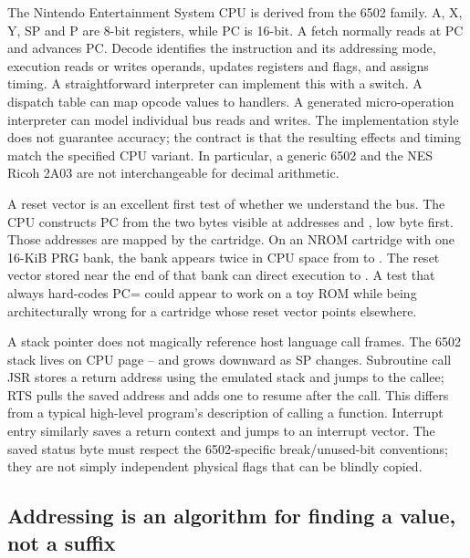 The Nintendo Entertainment System CPU is derived from the 6502 family. A, X, Y, SP and P are 8-bit registers, while PC is 16-bit. A fetch normally reads at PC and advances PC. Decode identifies the instruction and its addressing mode, execution reads or writes operands, updates registers and flags, and assigns timing. A straightforward interpreter can implement this with a switch. A dispatch table can map opcode values to handlers. A generated micro-operation interpreter can model individual bus reads and writes. The implementation style does not guarantee accuracy; the contract is that the resulting effects and timing match the specified CPU variant. In particular, a generic 6502 and the NES Ricoh 2A03 are not interchangeable for decimal arithmetic.

A reset vector is an excellent first test of whether we understand the bus. The CPU constructs PC from the two bytes visible at addresses  and , low byte first. Those addresses are mapped by the cartridge. On an NROM cartridge with one 16-KiB PRG bank, the bank appears twice in CPU space from  to . The reset vector stored near the end of that bank can direct execution to . A test that always hard-codes PC= could appear to work on a toy ROM while being architecturally wrong for a cartridge whose reset vector points elsewhere.

A stack pointer does not magically reference host language call frames. The 6502 stack lives on CPU page -- and grows downward as SP changes. Subroutine call JSR stores a return address using the emulated stack and jumps to the callee; RTS pulls the saved address and adds one to resume after the call. This differs from a typical high-level program's description of calling a function. Interrupt entry similarly saves a return context and jumps to an interrupt vector. The saved status byte must respect the 6502-specific break/unused-bit conventions; they are not simply independent physical flags that can be blindly copied.

\subsection{Addressing is an algorithm for finding a value, not a suffix}\label{01-foundations-i-ch016-addressing-is-an-algorithm-for-finding-a-value-not-a-suffix}

